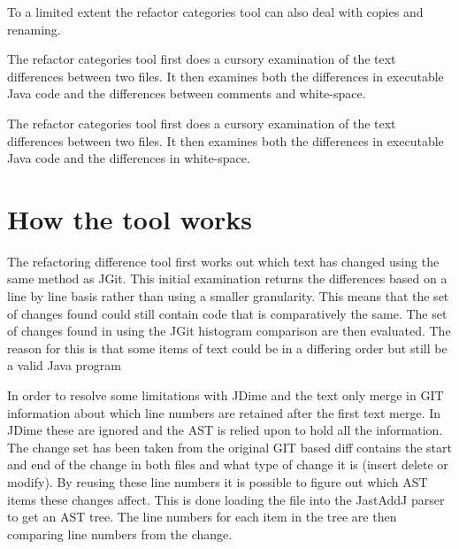 To a limited extent the refactor categories tool can also deal with copies and renaming.

The refactor categories tool first does a cursory examination of the text differences between two files. It then examines both the differences in executable Java code and the differences between comments and white-space. 


The refactor categories tool first does a cursory examination of the text differences between two files. It then examines both the differences in executable Java code and the differences in white-space.


\section{How the tool works}

The refactoring difference tool first works out which text has changed using the same method as JGit.
This initial examination returns the differences based on a line by line basis rather than using a smaller granularity.
This means that the set of changes found could still contain code that is comparatively the same.
The set of changes found in using the JGit histogram comparison are then evaluated.
The reason for this is that some items of text could be in a differing order but still be a valid Java program


In order to resolve some limitations with JDime and the text only merge in GIT information about which line numbers are retained after the first text merge.  In JDime these are ignored and the AST is relied upon to hold all the information.  The change set has been taken from the original GIT based diff contains the start and end of the change in both files and what type of change it is (insert delete or modify).  By reusing these line numbers it is possible to figure out which AST items these changes affect. This is done loading the file into the JastAddJ parser to get an AST tree. The line numbers for each item in the tree are then comparing line numbers from the change.

